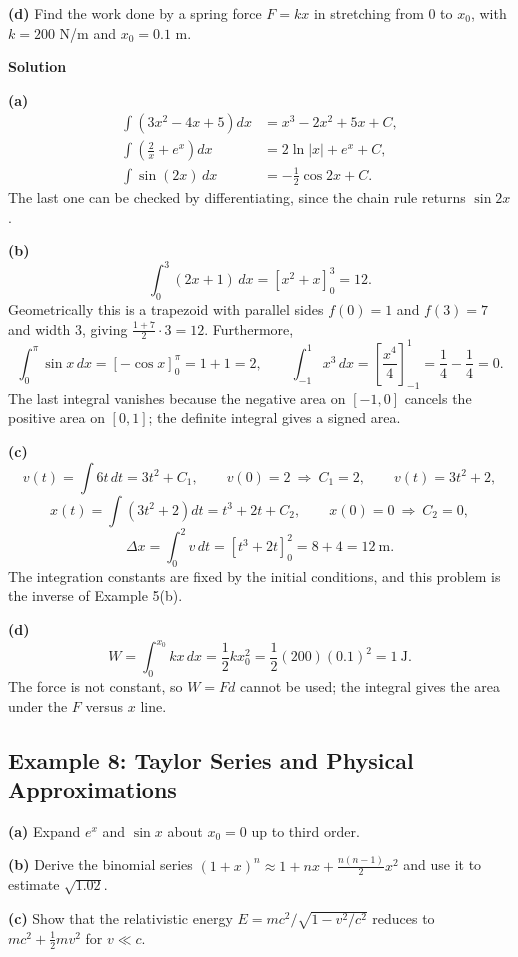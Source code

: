 \documentclass[12pt]{article}
\begin{document}
\textbf{(d)} Find the work done by a spring force $F = kx$ in stretching from $0$ to $x_0$, with $k = 200$ N/m and $x_0 = 0.1$ m.

\bigskip
\textbf{Solution}

\textbf{(a)}
\begin{align*}
\int\left(3x^2-4x+5\right)dx &= x^3-2x^2+5x+C, \\
\int\left(\frac{2}{x}+e^x\right)dx &= 2\ln|x| + e^x + C, \\
\int\sin(2x)\,dx &= -\frac{1}{2}\cos 2x + C .
\end{align*}
The last one can be checked by differentiating, since the chain rule returns $\sin 2x$.

\textbf{(b)}
\[
\int_0^3(2x+1)\,dx = \left[x^2+x\right]_0^3 = 12 .
\]
Geometrically this is a trapezoid with parallel sides $f(0) = 1$ and $f(3) = 7$ and width $3$, giving $\frac{1+7}{2}\cdot 3 = 12$. Furthermore,
\[
\int_0^\pi \sin x\,dx = \left[-\cos x\right]_0^\pi = 1+1 = 2,
\qquad
\int_{-1}^{1}x^3\,dx = \left[\frac{x^4}{4}\right]_{-1}^{1} = \frac{1}{4}-\frac{1}{4} = 0 .
\]
The last integral vanishes because the negative area on $[-1,0]$ cancels the positive area on $[0,1]$; the definite integral gives a signed area.

\textbf{(c)}
\[
v(t) = \int 6t\,dt = 3t^2+C_1,
\qquad
v(0) = 2 \ \Longrightarrow \ C_1 = 2,
\qquad
v(t) = 3t^2+2 ,
\]
\[
x(t) = \int\left(3t^2+2\right)dt = t^3+2t+C_2,
\qquad
x(0) = 0 \ \Longrightarrow \ C_2 = 0 ,
\]
\[
\Delta x = \int_0^2 v\,dt = \left[t^3+2t\right]_0^2 = 8+4 = 12\ \text{m}.
\]
The integration constants are fixed by the initial conditions, and this problem is the inverse of Example 5(b).

\textbf{(d)}
\[
W = \int_0^{x_0} kx\,dx = \frac{1}{2}kx_0^2 = \frac{1}{2}(200)(0.1)^2 = 1\ \text{J}.
\]
The force is not constant, so $W = Fd$ cannot be used; the integral gives the area under the $F$ versus $x$ line.


\subsection{Example 8: Taylor Series and Physical Approximations}

\textbf{(a)} Expand $e^x$ and $\sin x$ about $x_0 = 0$ up to third order.

\textbf{(b)} Derive the binomial series $(1+x)^n \approx 1+nx+\frac{n(n-1)}{2}x^2$ and use it to estimate $\sqrt{1.02}$.

\textbf{(c)} Show that the relativistic energy $E = mc^2/\sqrt{1-v^2/c^2}$ reduces to $mc^2+\frac{1}{2}mv^2$ for $v \ll c$.
\end{document}
